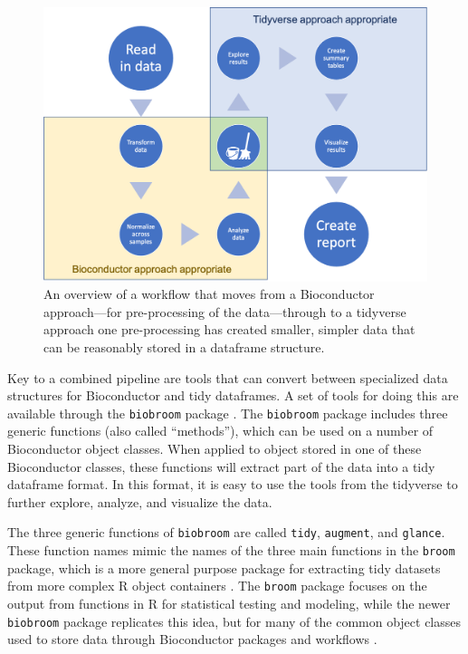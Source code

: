 \documentclass[]{tufte-book}
\begin{document}
\begin{figure}
\includegraphics[width=\textwidth]{figures/workflow} \caption[An overview of a workflow that moves from a Bioconductor approach---for pre-processing of the data---through to a tidyverse approach one pre-processing has created smaller, simpler data that can be reasonably stored in a dataframe structure]{An overview of a workflow that moves from a Bioconductor approach---for pre-processing of the data---through to a tidyverse approach one pre-processing has created smaller, simpler data that can be reasonably stored in a dataframe structure.}\label{fig:combinedworkflow}
\end{figure}

Key to a combined pipeline are tools that can convert between specialized data
structures for Bioconductor and tidy dataframes. A set of tools for doing this
are available through the \texttt{biobroom} package \citep{biobroom}. The \texttt{biobroom} package
includes three generic functions (also called ``methods''), which can be used
on a number of Bioconductor object classes. When applied to object stored in one
of these Bioconductor classes, these functions will extract part of the data
into a tidy dataframe format. In this format, it is easy to use the tools from
the tidyverse to further explore, analyze, and visualize the data.

The three generic functions of \texttt{biobroom} are called \texttt{tidy}, \texttt{augment},
and \texttt{glance}. These function names mimic the names of the three main functions
in the \texttt{broom} package, which is a more general purpose package for extracting
tidy datasets from more complex R object containers \citep{robinson2014broom}. The
\texttt{broom} package focuses on the output from functions in R for statistical
testing and modeling, while the newer \texttt{biobroom} package replicates this idea,
but for many of the common object classes used to store data through
Bioconductor packages and workflows \citep{biobroom}.
\end{document}
